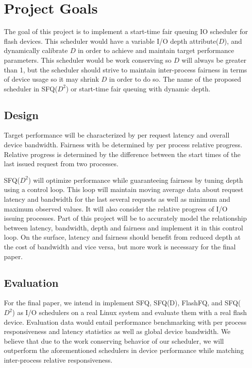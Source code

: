 \section{Project Goals}

The goal of this project is to implement a start-time fair queuing IO
scheduler for flash devices.  This scheduler would have a variable I/O
depth attribute($D$), and dynamically calibrate $D$ in order to
achieve and maintain target performance parameters.  This scheduler
would be work conserving so $D$ will always be greater than 1, but the
scheduler should strive to maintain inter-process fairness in terms of
device usage so it may shrink $D$ in order to do so.  The name of the
proposed scheduler in SFQ($D^2$) or start-time fair queuing with
dynamic depth.

\subsection{Design}

Target performance will be characterized by per request latency and
overall device bandwidth. Fairness with be determined by per process
relative progress.  Relative progress is determined by the difference
between the start times of the last issued request from two processes.

SFQ($D^2$) will optimize performance while guaranteeing fairness by
tuning depth using a control loop. This loop will maintain moving
average data about request latency and bandwidth for the last several
requests as well as minimum and maximum observed values. It will also
consider the relative progress of I/O issuing processes.  Part of this
project will be to accurately model the relationship between latency,
bandwidth, depth and fairness and implement it in this control
loop. On the surface, latency and fairness should benefit from reduced
depth at the cost of bandwidth and vice versa, but more work is
necessary for the final paper.

\subsection{Evaluation}

For the final paper, we intend in implement SFQ, SFQ(D), FlashFQ, and
SFQ($D^2$) as I/O schedulers on a real Linux system and evaluate them
with a real flash device.  Evaluation data would entail performance
benchmarking with per process responsiveness and latency statistics as
well as global device bandwidth.  We believe that due to the work
conserving behavior of our scheduler, we will outperform the
aforementioned schedulers in device performance while matching
inter-process relative responsiveness.

